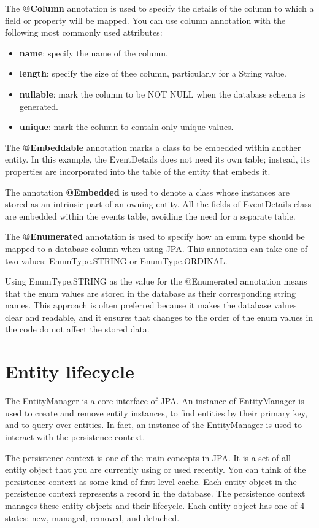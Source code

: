 The \textbf{@Column} annotation is used to specify the details of the column to which a field or property will be mapped. You can use column annotation with the following most commonly used attributes:
\begin{itemize}
\item \textbf{name}: specify the name of the column.
\item \textbf{length}: specify the size of thee column, particularly for a String value.
\item \textbf{nullable}: mark the column to be NOT NULL when the database schema is generated.
\item \textbf{unique}: mark the column to contain only unique values.
\end{itemize}


The \textbf{@Embeddable} annotation marks a class to be embedded within another entity.
In this example,  the EventDetails does not need its own table; instead, its properties are incorporated into the table of the entity that embeds it.

The annotation \textbf{@Embedded}  is used to denote a class whose instances are stored as an intrinsic part of an owning entity.
 All the fields of EventDetails class are embedded within the events table, avoiding the need for a separate table.

The \textbf{@Enumerated} annotation is used to specify how an enum type should be mapped to a database column when using JPA. This annotation can take one of two values: EnumType.STRING or EnumType.ORDINAL.

Using EnumType.STRING as the value for the @Enumerated annotation means that the enum values are stored in the database as their corresponding string names. This approach is often preferred because it makes the database values clear and readable, and it ensures that changes to the order of the enum values in the code do not affect the stored data.

\section{Entity lifecycle}

The EntityManager is a core interface of JPA.  An instance of EntityManager is used to create and remove  entity instances, to find entities by their primary key,  and to query over entities.  In fact,  an instance of the EntityManager is used to interact with the persistence context. 

The persistence context is one of the main concepts in JPA.
It is a set of all entity object that you are currently using or used recently. You can think of the persistence context as some kind of first-level cache. Each entity object in the persistence context represents a record in the database.
The persistence context manages these entity objects and their lifecycle. Each entity object has one of 4 states: new, managed, removed, and detached.


